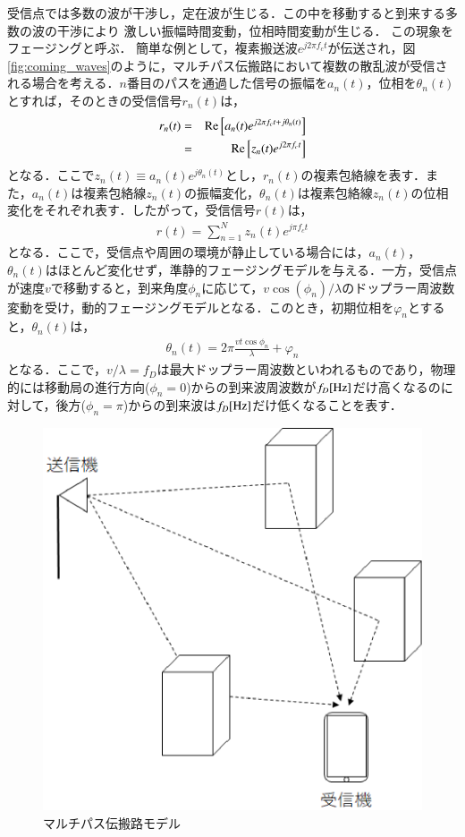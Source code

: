 受信点では多数の波が干渉し，定在波が生じる．この中を移動すると到来する多数の波の干渉により
激しい振幅時間変動，位相時間変動が生じる．
この現象をフェージングと呼ぶ\cite{okumura}．
簡単な例として，複素搬送波$e^{j2\pi f_ct}$が伝送され，図 \ref{fig:coming_waves}のように，マルチパス伝搬路において複数の散乱波が受信される場合を考える．$n$番目のパスを通過した信号の振幅を$a_n(t)$，位相を$\theta_n(t)$とすれば，そのときの受信信号$r_n(t)$は，
\begin{eqnarray}
r_n(t)&=&{\rm Re}\left[a_n(t)e^{j2\pi f_c t+j\theta_n(t)}\right]\nonumber \\
&=&{\rm Re}\left[z_n(t)e^{j2\pi f_c t}\right]
\end{eqnarray}
となる．ここで$z_n(t)\equiv a_n(t)e^{j\theta_n(t)}$とし，$r_n(t)$の複素包絡線を表す．また，$a_n(t)$は複素包絡線$z_n(t)$の振幅変化，$\theta_n(t)$は複素包絡線$z_n(t)$の位相変化をそれぞれ表す．したがって，受信信号$r(t)$は，
\begin{eqnarray}
r(t)=\sum_{n=1}^{N}z_n(t)e^{j\pi f_ct}
\end{eqnarray}
となる．ここで，受信点や周囲の環境が静止している場合には，$a_n(t)$，$\theta_n(t)$はほとんど変化せず，準静的フェージングモデルを与える．一方，受信点が速度$v$で移動すると，到来角度$\phi_n$に応じて，$v\cos(\phi_n)/\lambda$のドップラー周波数変動を受け，動的フェージングモデルとなる．このとき，初期位相を$\varphi_n$とすると，$\theta_n(t)$は，
\begin{eqnarray}
\theta_n(t)=2\pi\frac{vt\cos\phi_n}{\lambda}+\varphi_n
\end{eqnarray}
となる．ここで，$v/\lambda=f_D$は最大ドップラー周波数といわれるものであり，物理的には移動局の進行方向($\phi_n=0$)からの到来波周波数が$f_D[{\rm Hz}]$だけ高くなるのに対して，後方($\phi_n=\pi$)からの到来波は$f_D[{\rm Hz}]$だけ低くなることを表す．
\begin{figure}[t]
  \begin{center}
    \includegraphics[width=0.6\linewidth]{chapter2/figure/multipaths.eps}
    \caption{マルチパス伝搬路モデル}
    \label{fig:multipath}
  \end{center}
\end{figure}

